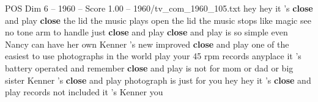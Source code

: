 \begin{textsample}{POS Dim 6 – 1960 – Score 1.00 – 1960/tv\_com\_1960\_105.txt}  \label{ex:f6_pos_027}
hey hey it 's \textbf{close} and play \textbf{close} the lid the music plays open the lid the music stops like magic see no tone arm to handle just \textbf{close} and play \textbf{close} and play is so simple even Nancy can have her own Kenner 's new improved \textbf{close} and play one of the easiest to use photographs in the world play your 45 rpm records anyplace it 's battery operated and remember \textbf{close} and play is not for mom or dad or big sister Kenner 's \textbf{close} and play photograph is just for you hey hey it 's \textbf{close} and play records not included it 's Kenner you

\end{textsample}
